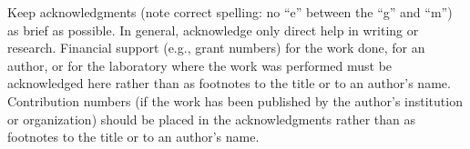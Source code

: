 \documentclass{ametsocV6.2}
\begin{document}
%


%


\acknowledgments
Keep acknowledgments (note correct spelling: no ``e'' between the ``g'' and
``m'') as brief as possible. In general, acknowledge only direct help in
writing or research. Financial support (e.g., grant numbers) for the work done, 
for an author, or for the laboratory where the work was performed must be 
acknowledged here rather than as footnotes to the title or to an author's name.
Contribution numbers (if the work has been published by the author's institution 
or organization) should be placed in the acknowledgments rather than as 
footnotes to the title or to an author's name.
\end{document}
